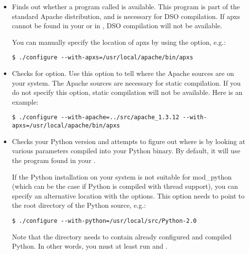 \begin{itemize}

\item
{}
Finds out whether a program called  is available. This
program is part of the standard Apache distribution, and is necessary
for DSO compilation. If apxs cannot be found in your  or in
, DSO compilation will not be available.

You can manually specify the location of apxs by using the
 option, e.g.:

\begin{verbatim}
$ ./configure --with-apxs=/usr/local/apache/bin/apxs 	
\end{verbatim}

\item
{}
Checks for  option. Use this option to
tell  where the Apache sources are on your
system. The Apache sources are necessary for static compilation. If
you do not specify this option, static compilation will not be
available. Here is an example:

\begin{verbatim}
$ ./configure --with-apache=../src/apache_1.3.12 --with-apxs=/usr/local/apache/bin/apxs
\end{verbatim}

\item
{}
Checks your Python version and attempts to figure out where
 is by looking at various parameters compiled into
your Python binary. By default, it will use the 
program found in your .

If the Python installation on your system is not suitable for
mod_python (which can be the case if Python is compiled with thread
support), you can specify an alternative location with the
 options. This option needs to point to
the root directory of the Python source, e.g.:

\begin{verbatim}
$ ./configure --with-python=/usr/local/src/Python-2.0
\end{verbatim}                      

Note that the directory needs to contain already configured and
compiled Python. In other words, you must at least run  and
.


\end{itemize}
